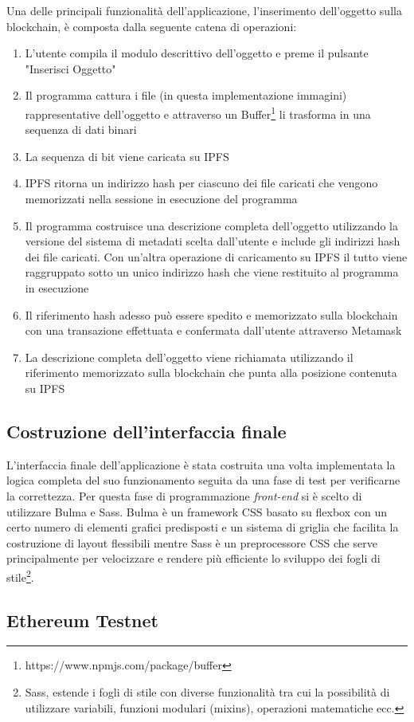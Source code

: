 Una delle principali funzionalità dell'applicazione, l'inserimento dell'oggetto sulla blockchain, è composta dalla seguente catena di operazioni:

\begin{enumerate}
    \item L'utente compila il modulo descrittivo dell'oggetto e preme il pulsante "Inserisci Oggetto"
    \item Il programma cattura i file (in questa implementazione immagini) rappresentative dell'oggetto e attraverso un Buffer\footnote{https://www.npmjs.com/package/buffer} li trasforma in una sequenza di dati binari
    \item La sequenza di bit viene caricata su IPFS
    \item IPFS ritorna un indirizzo hash per ciascuno dei file caricati che vengono memorizzati nella sessione in esecuzione del programma
    \item Il programma costruisce una descrizione completa dell'oggetto utilizzando la versione del sistema di metadati scelta dall'utente e include gli indirizzi hash dei file caricati. Con un’altra operazione di caricamento su IPFS il tutto viene raggruppato sotto un unico indirizzo hash che viene restituito al programma in esecuzione
    \item Il riferimento hash adesso può essere spedito e memorizzato sulla blockchain con una transazione effettuata e confermata dall'utente attraverso Metamask
    \item La descrizione completa dell'oggetto viene richiamata utilizzando il riferimento memorizzato sulla blockchain che punta alla posizione contenuta su IPFS
\end{enumerate}


\subsection{Costruzione dell'interfaccia finale}

L’interfaccia finale dell’applicazione è stata costruita una volta implementata la logica completa del suo funzionamento seguita da una fase di test per verificarne la correttezza. Per questa fase di programmazione \emph{front-end} si è scelto di utilizzare Bulma e Sass. Bulma è un framework CSS basato su flexbox con un certo numero di elementi grafici predisposti e un sistema di griglia che facilita la costruzione di layout flessibili mentre Sass è un preprocessore CSS che serve principalmente per velocizzare e rendere più efficiente lo sviluppo dei fogli di stile\footnote{Sass, estende i fogli di stile con diverse funzionalità tra cui la possibilità di utilizzare variabili, funzioni modulari (mixins), operazioni matematiche ecc.}. 


\subsection{Ethereum Testnet}



